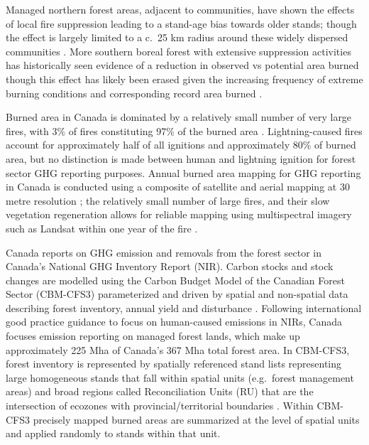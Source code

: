 \documentclass[, manuscript]{copernicus}
\begin{document}
Managed northern forest areas, adjacent to communities, have shown the
effects of local fire suppression leading to a stand-age bias towards
older stands; though the effect is largely limited to a c.~25 km radius
around these widely dispersed communities \citep{parisien2020}. More
southern boreal forest with extensive suppression activities has
historically seen evidence of a reduction in observed vs potential area
burned \citep{cummingEffectiveFireSuppression2005} though this effect
has likely been erased given the increasing frequency of extreme burning
conditions \citet{wangCriticalFireWeather2023} and corresponding record
area burned \citep{jainDriversImpactsRecordBreaking2024}.

Burned area in Canada is dominated by a relatively small number of very
large fires, with 3\% of fires constituting 97\% of the burned area
\citep{stocks2002}. Lightning-caused fires account for approximately
half of all ignitions and approximately 80\% of burned area, but no
distinction is made between human and lightning ignition for forest
sector GHG reporting purposes. Annual burned area mapping for GHG
reporting in Canada is conducted using a composite of satellite and
aerial mapping at 30 metre resolution \citep{hall2020}; the relatively
small number of large fires, and their slow vegetation regeneration
\citep{white2017} allows for reliable mapping using multispectral
imagery such as Landsat within one year of the fire \citep{whitman2018}.

Canada reports on GHG emission and removals from the forest sector in
Canada's National GHG Inventory Report (NIR). Carbon stocks and stock
changes are modelled using the Carbon Budget Model of the Canadian
Forest Sector (CBM-CFS3) \citep{kurzCBMCFS3ModelCarbondynamics2009}
parameterized and driven by spatial and non-spatial data describing
forest inventory, annual yield and disturbance
\citep{stinsonInventorybasedAnalysisCanadas2011}. Following
international good practice guidance to focus on human-caused emissions
in NIRs, Canada focuses emission reporting on managed forest lands,
which make up approximately 225 Mha of Canada's 367 Mha total forest
area. In CBM-CFS3, forest inventory is represented by spatially
referenced stand lists representing large homogeneous stands that fall
within spatial units (e.g.~forest management areas) and broad regions
called Reconciliation Units (RU) that are the intersection of ecozones
with provincial/territorial boundaries \citep{kurz2002}. Within CBM-CFS3
precisely mapped burned areas are summarized at the level of spatial
units and applied randomly to stands within that unit.
\end{document}
